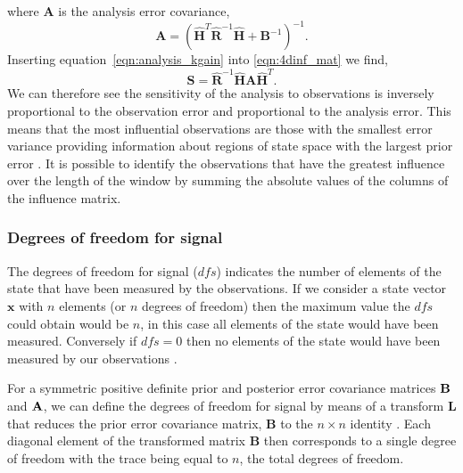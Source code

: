 \documentclass[11pt]{article}
\begin{document}
where $\textbf{A}$ is the analysis error covariance,
\begin{equation}
\textbf{A} = (\hat{\textbf{H}}^{T}\hat{\textbf{R}}^{-1}\hat{\textbf{H}} + \textbf{B}^{-1})^{-1}.
\end{equation}
Inserting equation~\eqref{eqn:analysis_kgain} into \eqref{eqn:4dinf_mat} we find,
 \begin{equation}
 \textbf{S} = \hat{\textbf{R}}^{-1}\hat{\textbf{H}}\textbf{A}\hat{\textbf{H}}^{T}.
 \end{equation}
We can therefore see the sensitivity of the analysis to observations is inversely proportional to the observation error and proportional to the analysis error. This means that the most influential observations are those with the smallest error variance providing information about regions of state space with the largest prior error \citep{Cardinali2004}. It is possible to identify the observations that have the greatest influence over the length of the window by summing the absolute values of the columns of the influence matrix.

\subsubsection{Degrees of freedom for signal} \label{DFSintro}%

The degrees of freedom for signal ($dfs$) indicates the number of elements of the state that have been measured by the observations. If we consider a state vector $\textbf{x}$ with $n$ elements (or $n$ degrees of freedom) then the maximum value the $dfs$ could obtain would be $n$, in this case all elements of the state would have been measured. Conversely if $dfs = 0$ then no elements of the state would have been measured by our observations \citep{Fowler2013}.

For a symmetric positive definite prior and posterior error covariance matrices $\bf{B}$ and $\bf{A}$, we can define the degrees of freedom for signal by means of a transform $\textbf{L}$ that reduces the prior error covariance matrix, $\textbf{B}$ to the $n \times n$ identity \citep{fisher2003estimation}. Each diagonal element of the transformed matrix $\textbf{B}$ then corresponds to a single degree of freedom with the trace being equal to $n$, the total degrees of freedom. 
\end{document}
